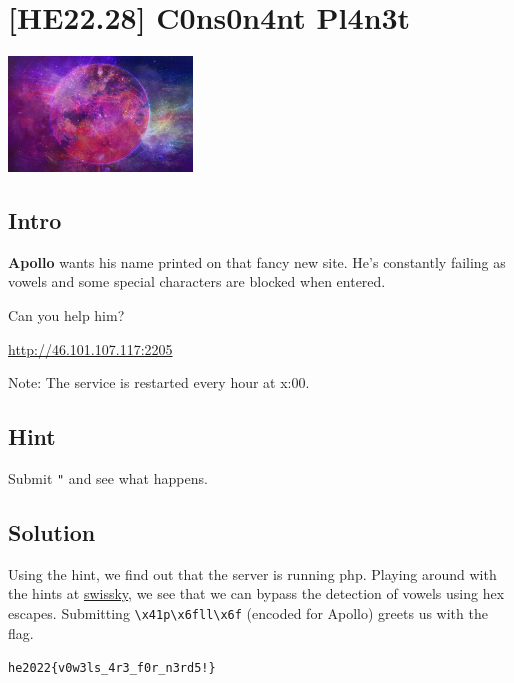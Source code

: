 
\hypertarget{he22.28}{%
\chapter{[HE22.28] C0ns0n4nt Pl4n3t}\label{he22.28}}

\begin{marginfigure}
	\includegraphics[width=49mm]{level7/challenge28.jpg}
\end{marginfigure}
\section{Intro}
\textbf{Apollo} wants his name printed on that fancy new site. He's constantly failing as vowels and some special characters are blocked when entered.

\noindent Can you help him?

\noindent \url{http://46.101.107.117:2205}

\noindent Note: The service is restarted every hour at x:00.
\section{Hint}
Submit \verb+"+ and see what happens.

\section{Solution}\label{hv22.28solution}

Using the hint, we find out that the server is running php.  Playing around with the hints at \href{https://github.com/swisskyrepo/PayloadsAllTheThings/tree/master/Command%20Injection#bypass-characters-filter-via-hex-encoding}{swissky}, we see that we can bypass the detection of vowels using hex escapes.  Submitting \verb+\x41p\x6fll\x6f+ (encoded for Apollo) greets us with the flag.

\noindent \verb+he2022{v0w3ls_4r3_f0r_n3rd5!}+





	









